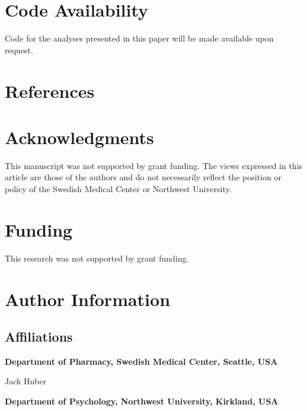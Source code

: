 \documentclass[
]{article}
\newlength{\cslhangindent}
\newlength{\cslentryspacingunit} %
\newenvironment{CSLReferences}[2] %
 {%
  \setlength{\parindent}{0pt}
  \ifodd #1
  \let\oldpar\par
  \def\par{\hangindent=\cslhangindent\oldpar}
  \fi
  \setlength{\parskip}{#2\cslentryspacingunit}
 }%
 {}
\begin{document}
\hypertarget{code-availability}{%
\section{Code Availability}\label{code-availability}}

Code for the analyses presented in this paper will be made available upon request.

\hypertarget{references}{%
\section*{References}\label{references}}

\hypertarget{refs}{}
\begin{CSLReferences}{0}{0}
\end{CSLReferences}

\hypertarget{acknowledgments}{%
\section{Acknowledgments}\label{acknowledgments}}

This manuscript was not supported by grant funding. The views expressed in this article are those of the authors and do not necessarily reflect the position or policy of the Swedish Medical Center or Northwest University.

\hypertarget{funding}{%
\section{Funding}\label{funding}}

This research was not supported by grant funding.

\hypertarget{author-information}{%
\section{Author Information}\label{author-information}}

\hypertarget{affiliations}{%
\subsection{Affiliations}\label{affiliations}}

\textbf{Department of Pharmacy, Swedish Medical Center, Seattle, USA}

Jack Huber

\textbf{Department of Psychology, Northwest University, Kirkland, USA}
\end{document}
